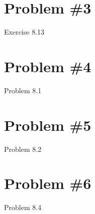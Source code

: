 \documentclass[12pt]{article}
\begin{document}
	\section*{Problem \#3}
	Exercise 8.13 \\
	
	\section*{Problem \#4}
	Problem 8.1 \\
	
	\section*{Problem \#5}
	Problem 8.2 \\
	
	\section*{Problem \#6}
	Problem 8.4 \\
	
\end{document}
